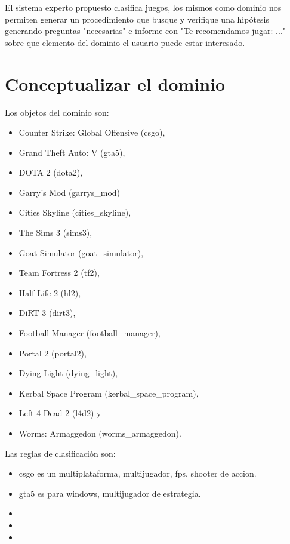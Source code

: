 \documentclass[11pt,oneside,a4paper]{article}
\begin{document}
El sistema experto propuesto clasifica juegos, los mismos como 
dominio nos permiten generar un procedimiento que busque y verifique
una hipótesis generando preguntas "necesarias" e informe con          %
"Te recomendamos jugar: ..." sobre que elemento del dominio el
usuario puede estar interesado.


\section{Conceptualizar el dominio}

Los objetos del dominio son:

\begin{multicols}{2}
\begin{itemize}
\item Counter Strike: Global Offensive (csgo), 
\item Grand Theft Auto: V (gta5), 
\item DOTA 2 (dota2), 
\item Garry's Mod (garrys\_mod)
\item Cities Skyline (cities\_skyline), 
\item The Sims 3 (sims3), 
\item Goat Simulator (goat\_simulator),
\item Team Fortress 2 (tf2), 
\item Half-Life 2 (hl2), 
\item DiRT 3 (dirt3), 
\item Football Manager (football\_manager), 
\item Portal 2 (portal2), 
\item Dying Light (dying\_light), 
\item Kerbal Space Program (kerbal\_space\_program), 
\item Left 4 Dead 2 (l4d2) y 
\item Worms: Armaggedon (worms\_armaggedon).
\end{itemize}
\end{multicols}

Las reglas de clasificación son:

\begin{itemize}
  \item csgo es un multiplataforma, multijugador, fps, shooter de accion. 
  \item gta5 es para windows, multijugador de estrategia.
  \item 
  \item 
  \item 
\end{itemize}
\end{document}
